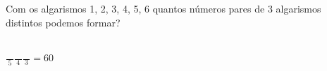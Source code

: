 \begin{ex}
 Com os algarismos 1, 2, 3, 4, 5, 6 quantos números pares de 3 algarismos distintos podemos formar?
 \begin{sol}
     \phantom{A} \\
 $\frac{\phantom{10}}{5}\frac{\phantom{10}}{4}\frac{\phantom{10}}{3}= 60$
 \end{sol}
\end{ex}